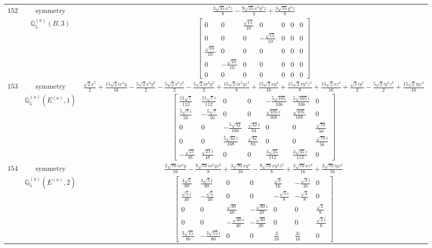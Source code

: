 \documentclass[fleqn,8pt,landscape]{jsarticle}
\begin{document}
\begin{longtable}{ccc}
$ 152 $ & $ \text{symmetry} $ & $ \frac{3 \sqrt{35} x^{4} z}{8} - \frac{9 \sqrt{35} x^{2} y^{2} z}{4} + \frac{3 \sqrt{35} y^{4} z}{8} $ \\
$  $ & $ \mathbb{Q}_{5}^{(a)}(B,3) $ & $ \begin{bmatrix} 0 & 0 & \frac{\sqrt{15}}{10} & 0 & 0 & 0 & 0 \\ 0 & 0 & 0 & - \frac{\sqrt{15}}{10} & 0 & 0 & 0 \\ \frac{\sqrt{10}}{10} & 0 & 0 & 0 & 0 & 0 & 0 \\ 0 & - \frac{\sqrt{10}}{10} & 0 & 0 & 0 & 0 & 0 \\ 0 & 0 & 0 & 0 & 0 & 0 & 0 \end{bmatrix} $ \\ \hline
$ 153 $ & $ \text{symmetry} $ & $ \frac{\sqrt{2} x^{5}}{2} + \frac{15 \sqrt{2} i x^{4} y}{16} - \frac{5 \sqrt{2} x^{3} y^{2}}{2} - \frac{5 \sqrt{2} x^{3} z^{2}}{2} - \frac{5 \sqrt{2} i x^{2} y^{3}}{2} + \frac{15 \sqrt{2} i x^{2} y z^{2}}{8} + \frac{15 \sqrt{2} x y^{4}}{16} + \frac{15 \sqrt{2} x y^{2} z^{2}}{8} + \frac{15 \sqrt{2} x z^{4}}{16} + \frac{\sqrt{2} i y^{5}}{2} - \frac{5 \sqrt{2} i y^{3} z^{2}}{2} + \frac{15 \sqrt{2} i y z^{4}}{16} $ \\
$  $ & $ \mathbb{Q}_{5}^{(a)}(E^{(a)},1) $ & $ \begin{bmatrix} \frac{11 \sqrt{7}}{112} & \frac{11 \sqrt{7} i}{112} & 0 & 0 & - \frac{5 \sqrt{105}}{336} & \frac{5 \sqrt{105} i}{336} & 0 \\ \frac{5 \sqrt{7} i}{56} & - \frac{5 \sqrt{7}}{56} & 0 & 0 & \frac{\sqrt{105} i}{168} & \frac{\sqrt{105}}{168} & 0 \\ 0 & 0 & - \frac{5 \sqrt{42}}{168} & \frac{\sqrt{42} i}{84} & 0 & 0 & \frac{\sqrt{70}}{56} \\ 0 & 0 & \frac{5 \sqrt{42} i}{168} & \frac{\sqrt{42}}{84} & 0 & 0 & \frac{\sqrt{70} i}{56} \\ - \frac{\sqrt{21}}{48} & \frac{\sqrt{21} i}{48} & 0 & 0 & \frac{3 \sqrt{35}}{112} & \frac{3 \sqrt{35} i}{112} & 0 \end{bmatrix} $ \\ \hline
$ 154 $ & $ \text{symmetry} $ & $ \frac{3 \sqrt{70} i x^{4} y}{16} - \frac{9 \sqrt{70} i x^{2} y z^{2}}{8} + \frac{3 \sqrt{70} x y^{4}}{16} - \frac{9 \sqrt{70} x y^{2} z^{2}}{8} + \frac{3 \sqrt{70} x z^{4}}{16} + \frac{3 \sqrt{70} i y z^{4}}{16} $ \\
$  $ & $ \mathbb{Q}_{5}^{(a)}(E^{(a)},2) $ & $ \begin{bmatrix} \frac{3 \sqrt{5}}{80} & \frac{3 \sqrt{5} i}{80} & 0 & 0 & \frac{\sqrt{3}}{16} & - \frac{\sqrt{3} i}{16} & 0 \\ \frac{\sqrt{5} i}{40} & - \frac{\sqrt{5}}{40} & 0 & 0 & - \frac{\sqrt{3} i}{8} & - \frac{\sqrt{3}}{8} & 0 \\ 0 & 0 & \frac{\sqrt{30}}{40} & - \frac{\sqrt{30} i}{20} & 0 & 0 & \frac{\sqrt{2}}{8} \\ 0 & 0 & - \frac{\sqrt{30} i}{40} & - \frac{\sqrt{30}}{20} & 0 & 0 & \frac{\sqrt{2} i}{8} \\ \frac{3 \sqrt{15}}{80} & - \frac{3 \sqrt{15} i}{80} & 0 & 0 & \frac{3}{16} & \frac{3 i}{16} & 0 \end{bmatrix} $ \\ \hline

\end{longtable}
\end{document}
